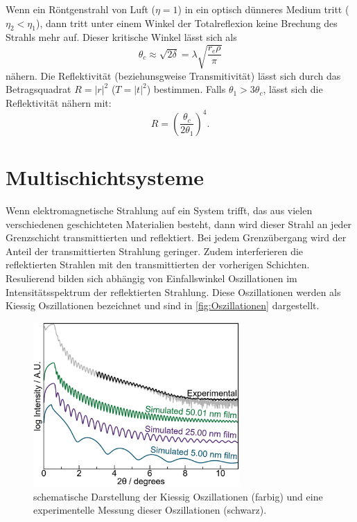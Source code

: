 Wenn ein Röntgenstrahl von Luft ($\eta = 1$) in ein optisch dünneres Medium tritt ($\eta_2 < \eta_1$), dann tritt unter einem Winkel der Totalreflexion
keine Brechung des Strahls mehr auf. Dieser kritische Winkel lässt sich als
\begin{equation}
    \label{eqn:theta_total}
    \theta_c \approx \sqrt{2\delta} = \lambda \sqrt{\frac{r_e \rho}{\pi}}
\end{equation}
nähern. 
Die Reflektivität (beziehunsgweise Transmitivität) lässt sich durch das Betragsquadrat $R = |r|^2$ ($T= |t|^2$) bestimmen. Falls $\theta_1 > 3 \theta_c$,
lässt sich die Reflektivität nähern mit:
\begin{equation}
    R = \left(\frac{\theta_c}{2\theta_1}\right)^4.
\end{equation}

\section{Multischichtsysteme}
Wenn elektromagnetische Strahlung auf ein System trifft, das aus vielen verschiedenen geschichteten Materialien besteht, dann wird dieser Strahl an jeder Grenzschicht transmittierten und reflektiert. 
Bei jedem Grenzübergang wird der Anteil der transmittierten Strahlung geringer. Zudem interferieren die reflektierten Strahlen mit den transmittierten der vorherigen Schichten. Resulierend bilden sich
abhängig von Einfallswinkel Oszillationen im Intensitätsspektrum der reflektierten Strahlung. Diese Oszillationen werden als Kiessig Oszillationen bezeichnet und sind in \autoref{fig:Oszillationen} dargestellt.
\begin{figure}
    \centering
    \includegraphics[width = 0.7\textwidth]{bilder/Oszillationen.jpg}
    \caption{schematische Darstellung der Kiessig Oszillationen (farbig) und eine experimentelle Messung dieser Oszillationen (schwarz)\cite{Kiessig}.}
    \label{fig:Oszillationen}
\end{figure}
